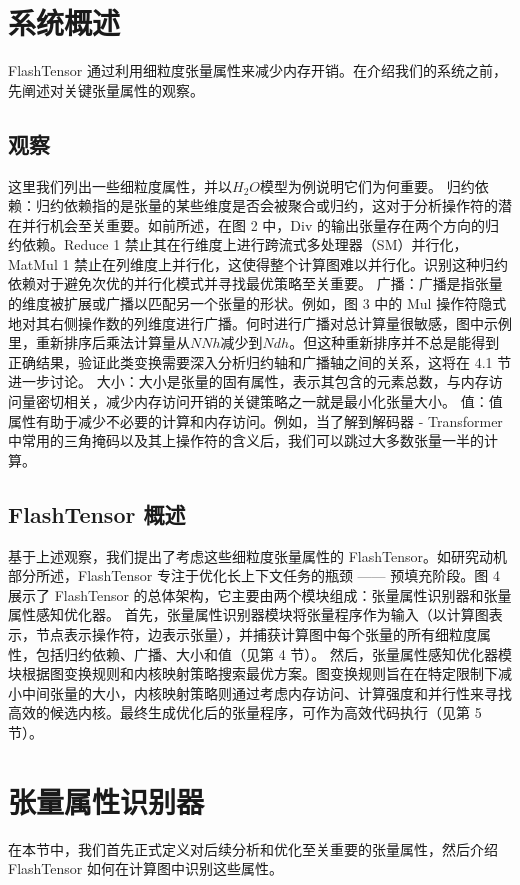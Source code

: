 \section{系统概述}

FlashTensor 通过利用细粒度张量属性来减少内存开销。在介绍我们的系统之前，先阐述对关键张量属性的观察。

\subsection{观察}

这里我们列出一些细粒度属性，并以\(H_{2}O\)模型为例说明它们为何重要。
归约依赖：归约依赖指的是张量的某些维度是否会被聚合或归约，这对于分析操作符的潜在并行机会至关重要。如前所述，在图 2 中，Div 的输出张量存在两个方向的归约依赖。Reduce 1 禁止其在行维度上进行跨流式多处理器（SM）并行化，MatMul 1 禁止在列维度上并行化，这使得整个计算图难以并行化。识别这种归约依赖对于避免次优的并行化模式并寻找最优策略至关重要。
广播：广播是指张量的维度被扩展或广播以匹配另一个张量的形状。例如，图 3 中的 Mul 操作符隐式地对其右侧操作数的列维度进行广播。何时进行广播对总计算量很敏感，图中示例里，重新排序后乘法计算量从\(NNh\)减少到\(Ndh\)。但这种重新排序并不总是能得到正确结果，验证此类变换需要深入分析归约轴和广播轴之间的关系，这将在 4.1 节进一步讨论。
大小：大小是张量的固有属性，表示其包含的元素总数，与内存访问量密切相关，减少内存访问开销的关键策略之一就是最小化张量大小。
值：值属性有助于减少不必要的计算和内存访问。例如，当了解到解码器 - Transformer 中常用的三角掩码以及其上操作符的含义后，我们可以跳过大多数张量一半的计算。
\subsection{FlashTensor 概述}
基于上述观察，我们提出了考虑这些细粒度张量属性的 FlashTensor。如研究动机部分所述，FlashTensor 专注于优化长上下文任务的瓶颈 —— 预填充阶段。图 4 展示了 FlashTensor 的总体架构，它主要由两个模块组成：张量属性识别器和张量属性感知优化器。
首先，张量属性识别器模块将张量程序作为输入（以计算图表示，节点表示操作符，边表示张量），并捕获计算图中每个张量的所有细粒度属性，包括归约依赖、广播、大小和值（见第 4 节）。
然后，张量属性感知优化器模块根据图变换规则和内核映射策略搜索最优方案。图变换规则旨在在特定限制下减小中间张量的大小，内核映射策略则通过考虑内存访问、计算强度和并行性来寻找高效的候选内核。最终生成优化后的张量程序，可作为高效代码执行（见第 5 节）。


\section{张量属性识别器}
在本节中，我们首先正式定义对后续分析和优化至关重要的张量属性，然后介绍 FlashTensor 如何在计算图中识别这些属性。
